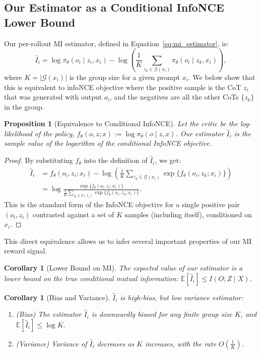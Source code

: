 \documentclass{article}
\theoremstyle{plain}
\newtheorem{proposition}[theorem]{Proposition}
\newtheorem{corollary}[theorem]{Corollary}
\begin{document}
\subsection{Our Estimator as a Conditional InfoNCE Lower Bound}
Our per-rollout MI estimator, defined in Equation~\ref{eq:mi_estimator}, is:
\begin{equation}
    \hat{I}_i = \log \pi_\theta(o_i \mid z_i, x_i) - \log \left(\frac{1}{K} \sum_{z_k \in \mathcal{G}(x_i)} \pi_\theta(o_i \mid z_k, x_i)\right),
\end{equation}
where $K = |\mathcal{G}(x_i)|$ is the group size for a given prompt $x_i$. 
We below show that this is equivalent to infoNCE objective where the positive sample is the CoT $z_i$ that was generated with output $o_i$, and the negatives are all the other CoTs $\{z_k\}$ in the group.

\begin{proposition}[Equivalence to Conditional InfoNCE]
\label{prop:equivalence_infonce}
Let the critic be the log-likelihood of the policy, $f_\theta(o, z; x) := \log \pi_\theta(o \mid z, x)$. Our estimator $\hat{I}_i$ is the sample value of the logarithm of the conditional InfoNCE objective.
\end{proposition}
\begin{proof}
By substituting $f_\theta$ into the definition of $\hat{I}_i$, we get:
\begin{align*}
\hat{I}_i &= f_\theta(o_i, z_i; x_i) - \log\left(\frac{1}{K} \sum_{z_k \in \mathcal{G}(x_i)} \exp\{f_\theta(o_i, z_k; x_i)\}\right) \\
&= \log \frac{\exp\{f_\theta(o_i, z_i; x_i)\}}{\frac{1}{K} \sum_{z_k \in \mathcal{G}(x_i)} \exp\{f_\theta(o_i, z_k; x_i)\}}.
\end{align*}
This is the standard form of the InfoNCE objective for a single positive pair $(o_i, z_i)$ contrasted against a set of $K$ samples (including itself), conditioned on $x_i$.
\end{proof}

This direct equivalence allows us to infer several important properties of our MI reward signal.

\begin{corollary}[Lower Bound on MI]
\label{cor:lower_bound}
The expected value of our estimator is a lower bound on the true conditional mutual information: $\mathbb{E}[\hat{I}_i] \le I(O;Z \mid X)$.
\end{corollary}

\begin{corollary}[Bias and Variance] $\hat{I}_i$ is high-bias, but low variance estimator:
\label{cor:bias_variance}
\begin{enumerate}
    \item \textit{(Bias)} The estimator $\hat{I}_i$ is downwardly biased for any finite group size $K$, and \(
    \mathbb{E}[\hat{I}_i] \leq \log K
    \).
    \item \textit{(Variance)} Variance of $\hat{I}_i$ decreases as $K$ increases, with the rate \(O\left(\frac{1}{K}\right)\).
\end{enumerate}
\end{corollary}
\end{document}
